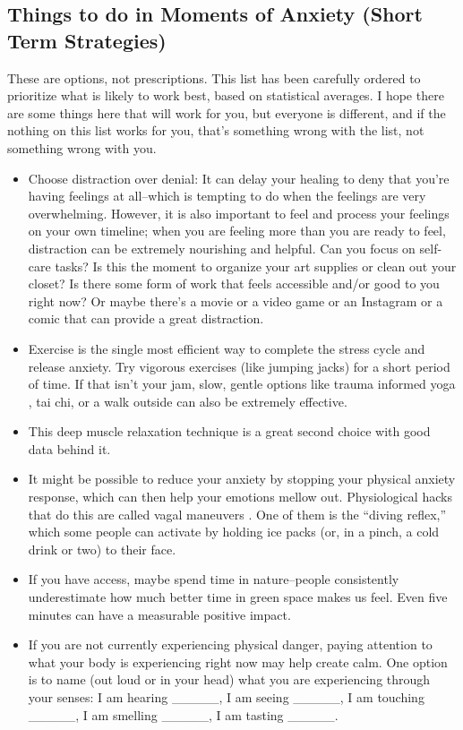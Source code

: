 \documentclass[12pt,letterpaper]{article}
\begin{document}
\subsection{Things to do in Moments of Anxiety (Short Term Strategies)}
\label{sec:shorttermanxiety}
These are options, not prescriptions. This list has been carefully ordered to prioritize what is likely to work best, based on statistical averages. I hope there are some things here that will work for you, but everyone is different, and if the nothing on this list works for you, that's something wrong with the list, not something wrong with you.
\begin{itemize}
    \item Choose distraction over denial: It can delay your healing to deny that you're having feelings at all--which is tempting to do when the feelings are very overwhelming. However, it is also important to feel and process your feelings on your own timeline; when you are feeling more than you are ready to feel, distraction can be extremely nourishing and helpful. Can you focus on self-care tasks? Is this the moment to organize your art supplies or clean out your closet? Is there some form of work that feels accessible and/or good to you right now? Or maybe there's a movie or a video game or an Instagram or a comic that can provide a great distraction.
    \item Exercise is the single most efficient way to complete the stress cycle and release anxiety. Try vigorous exercises (like jumping jacks) for a short period of time. If that isn't your jam, slow, gentle options like trauma informed yoga \cite{gesselYoga}, tai chi, or a walk outside can also be extremely effective.
    \item This deep muscle relaxation technique \cite{michiganProgressive} is a great second choice with good data behind it.
    \item It might be possible to reduce your anxiety by stopping your physical anxiety response, which can then help your emotions mellow out. Physiological hacks that do this are called vagal maneuvers \cite{dilonardoValsalva}. One of them is the “diving reflex,” which some people can activate by holding ice packs (or, in a pinch, a cold drink or two) to their face.
    \item If you have access, maybe spend time in nature--people consistently underestimate how much better time in green space makes us feel. Even five minutes can have a measurable positive impact.
    \item If you are not currently experiencing physical danger, paying attention to what your body is experiencing right now may help create calm. One option is to name (out loud or in your head) what you are experiencing through your senses: I am hearing \_\_\_\_\_, I am seeing \_\_\_\_\_, I am touching \_\_\_\_\_, I am smelling \_\_\_\_\_, I am tasting \_\_\_\_\_.

\end{itemize}
\end{document}
